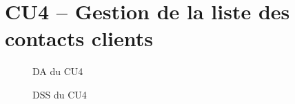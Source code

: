 \section{CU4 – Gestion de la liste des contacts clients}
\vspace{2cm}
\begin{figure}[H]
\noindent{}
\caption{DA du CU4}
\end{figure}

\begin{figure}[H]
\noindent{}
\caption{DSS du CU4}
\end{figure}




